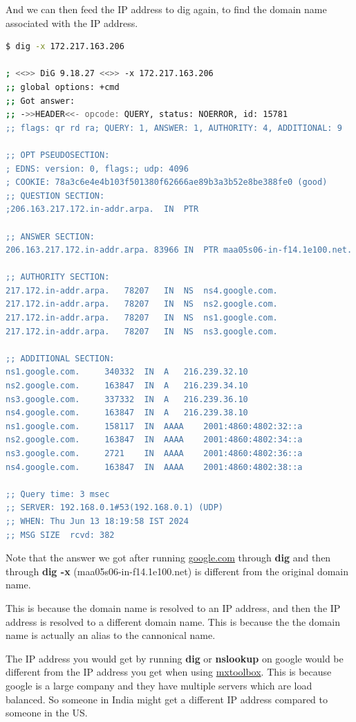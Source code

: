 And we can then feed the IP address to dig again, to find
the domain name associated with the IP address.

\begin{lstlisting}[language=bash, basicstyle=\scriptsize\ttfamily]
$ dig -x 172.217.163.206

; <<>> DiG 9.18.27 <<>> -x 172.217.163.206
;; global options: +cmd
;; Got answer:
;; ->>HEADER<<- opcode: QUERY, status: NOERROR, id: 15781
;; flags: qr rd ra; QUERY: 1, ANSWER: 1, AUTHORITY: 4, ADDITIONAL: 9

;; OPT PSEUDOSECTION:
; EDNS: version: 0, flags:; udp: 4096
; COOKIE: 78a3c6e4e4b103f501380f62666ae89b3a3b52e8be388fe0 (good)
;; QUESTION SECTION:
;206.163.217.172.in-addr.arpa.	IN	PTR

;; ANSWER SECTION:
206.163.217.172.in-addr.arpa. 83966 IN	PTR	maa05s06-in-f14.1e100.net.

;; AUTHORITY SECTION:
217.172.in-addr.arpa.	78207	IN	NS	ns4.google.com.
217.172.in-addr.arpa.	78207	IN	NS	ns2.google.com.
217.172.in-addr.arpa.	78207	IN	NS	ns1.google.com.
217.172.in-addr.arpa.	78207	IN	NS	ns3.google.com.

;; ADDITIONAL SECTION:
ns1.google.com.		340332	IN	A	216.239.32.10
ns2.google.com.		163847	IN	A	216.239.34.10
ns3.google.com.		337332	IN	A	216.239.36.10
ns4.google.com.		163847	IN	A	216.239.38.10
ns1.google.com.		158117	IN	AAAA	2001:4860:4802:32::a
ns2.google.com.		163847	IN	AAAA	2001:4860:4802:34::a
ns3.google.com.		2721	IN	AAAA	2001:4860:4802:36::a
ns4.google.com.		163847	IN	AAAA	2001:4860:4802:38::a

;; Query time: 3 msec
;; SERVER: 192.168.0.1#53(192.168.0.1) (UDP)
;; WHEN: Thu Jun 13 18:19:58 IST 2024
;; MSG SIZE  rcvd: 382
\end{lstlisting}

Note that the answer we got after running
\href{https://google.com}{google.com} through
\textbf{dig} and then through \textbf{dig -x}
(maa05s06-in-f14.1e100.net) is
different from the original domain name.

This is because the domain name is resolved to
an IP address, and then the IP address is resolved
to a different domain name. This is because the
the domain name is actually an alias to the
cannonical name.

\begin{remark}
  The IP address you would get by running
  \textbf{dig} or \textbf{nslookup} on google
  would be different from the IP address you
  get when using \href{https://mxtoolbox.com/}{mxtoolbox}.
  This is because google is a large company and
  they have multiple servers which are load balanced.
  So someone in India might get a different IP address
  compared to someone in the US.
\end{remark}

